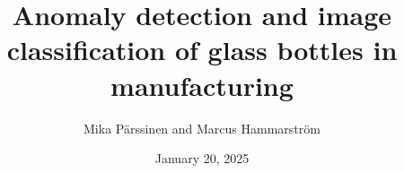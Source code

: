\documentclass[a4paper]{article}
\title{Anomaly detection and image classification of glass bottles in manufacturing}
\author{Mika Pärssinen and Marcus Hammarström}
\date{January 20, 2025}
\begin{document}
\maketitle










\renewcommand{\refname}{References}


\end{document}
